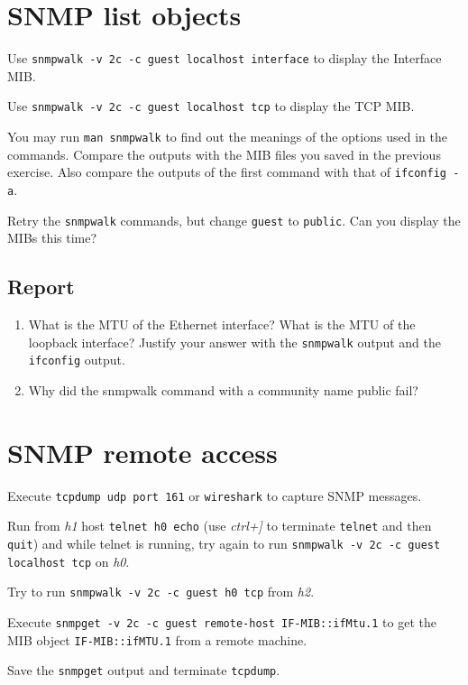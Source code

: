 \documentclass{../UTNetLab}
\begin{document}
\section{SNMP list objects}
    Use \lstinline{snmpwalk -v 2c -c guest localhost interface} to display the Interface MIB.

    Use \lstinline{snmpwalk -v 2c -c guest localhost tcp} to display the TCP MIB.

    You may run \lstinline{man snmpwalk} to find out the meanings of the options used in the commands. Compare the outputs with the MIB files you saved in the previous exercise. Also compare the outputs of the first command with that of \lstinline{ifconfig -a}.

    Retry the \lstinline{snmpwalk} commands, but change \lstinline{guest} to \lstinline{public}. Can you display the MIBs this time?
    
    \subsection*{Report}
    \begin{enumerate}
        \item What is the MTU of the Ethernet interface? What is the MTU of the loopback interface? Justify your answer with the \lstinline{snmpwalk} output and the \lstinline{ifconfig} output.
        \item Why did the snmpwalk command with a community name public fail?
    \end{enumerate}

\section{SNMP remote access}
    Execute \lstinline{tcpdump udp port 161} or \lstinline{wireshark} to capture SNMP messages.

    Run from \textit{h1} host \lstinline[emph={h0}]{telnet h0 echo} (use \textit{ctrl+]} to terminate \lstinline{telnet} and then \lstinline{quit}) and while telnet is running, try again to run \lstinline{snmpwalk -v 2c -c guest localhost tcp} on \textit{h0}.

    Try to run \lstinline[emph={h0}]{snmpwalk -v 2c -c guest h0 tcp} from \textit{h2}.

    Execute \lstinline[emph={your-host, remote-host}]{snmpget -v 2c -c guest remote-host IF-MIB::ifMtu.1} to get the MIB object \texttt{IF-MIB::ifMTU.1} from a remote machine.

    Save the \lstinline{snmpget} output and terminate \lstinline{tcpdump}.
\end{document}
